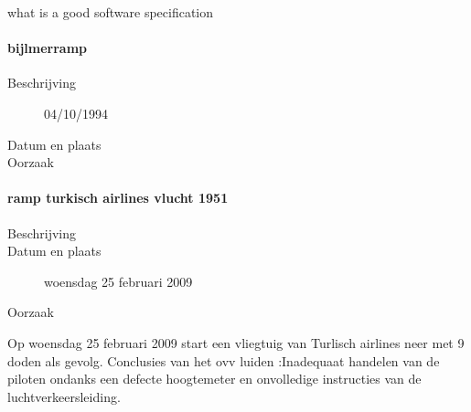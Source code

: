  \cite{jonkerTreurKlush200informativeAgents}
\cite{boehmBoseLeeRequirementsNegotiations}
\cite{muHungJinLiu2013inconsistencyReqs}
\cite{hunterNuseibeh1996manageSpecs}
\cite{myloloupos1992representingReqs}
\cite{zavePamela4darkCorners}
\cite{zavePAmela1997regEngineering}


what is a good software specification

\cite{fvaandrager2322010Goodmodel}
\cite{onix01102022devopmodel}
\cite{sulemani04012021softwareprocesmodel}
\cite{globalluxsoft18102017softdev}
\cite{wiegers30052022SRS}
\cite{muller06092020goodspecification}
\cite{informit30062008reqmanagement}
\cite{altexsoft15092020writingSRS}





\paragraph{bijlmerramp}

\begin{description}
	\item[Beschrijving] 04/10/1994
	\item[Datum en plaats] 
	\item[Oorzaak]
\end{description}


\cite{aviationsafety04101992airplaneCrashBijlmer}

\paragraph{ramp turkisch airlines vlucht 1951}

\begin{description}
	\item[Beschrijving]
	\item[Datum en plaats] woensdag 25 februari 2009
	\item[Oorzaak]
\end{description}
Op woensdag 25 februari 2009 start een vliegtuig van Turlisch airlines neer met 9 doden als gevolg.
Conclusies van het ovv luiden :Inadequaat handelen van de piloten ondanks een defecte hoogtemeter en onvolledige instructies van de luchtverkeersleiding.

